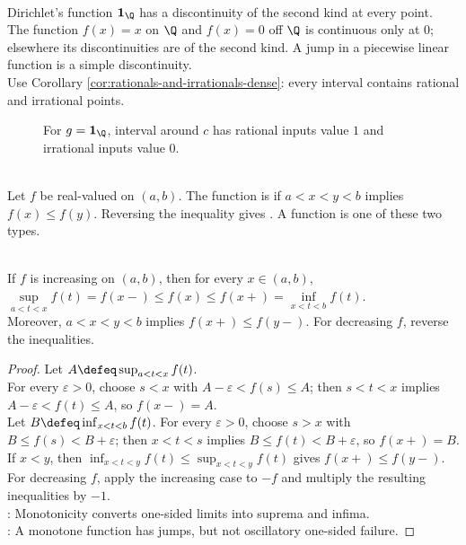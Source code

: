 \begin{example} \label{ex:basic-discontinuity-types} \\
Dirichlet's function $\mathbf{1}_{\Q}$ has a discontinuity of the second kind at every point.\\
The function $f(x)=x$ on $\Q$ and $f(x)=0$ off $\Q$ is continuous only at $0$; elsewhere its discontinuities are of the second kind. A jump in a piecewise linear function is a simple discontinuity.\\
Use Corollary \ref{cor:rationals-and-irrationals-dense}: every interval contains rational and irrational points.
\end{example}

\begin{figure}[H]
  \centering
  
  \caption{For $g=\mathbf{1}_{\Q}$, interval around $c$ has rational inputs value $1$ and irrational inputs value $0$.}
  \label{fig:dirichlet-dense-rows}
\end{figure}

\begin{definition} \label{def:monotone-real-function} \\
Let $f$ be real-valued on $(a,b)$. The function is  if $a<x<y<b$ implies $f(x)\leq f(y)$. Reversing the inequality gives . A  function is one of these two types.
\end{definition}

\begin{theorem} \label{thm:monotone-functions-one-sided-limits} \\
If $f$ is increasing on $(a,b)$, then for every $x\in(a,b)$, $\sup\limits_{a<t<x}f(t)=f(x-)\leq f(x)\leq f(x+)=\inf\limits_{x<t<b}f(t)$.\\
Moreover, $a<x<y<b$ implies $f(x+)\leq f(y-)$. For decreasing $f$, reverse the inequalities.
\begin{proof}
Let $A\defeq\sup_{a<t<x}f(t)$.\\
For every $\varepsilon>0$, choose $s<x$ with $A-\varepsilon<f(s)\leq A$; then $s<t<x$ implies $A-\varepsilon<f(t)\leq A$, so $f(x-)=A$.\\
Let $B\defeq\inf_{x<t<b}f(t)$. For every $\varepsilon>0$, choose $s>x$ with $B\leq f(s)<B+\varepsilon$; then $x<t<s$ implies $B\leq f(t)<B+\varepsilon$, so $f(x+)=B$. If $x<y$, then $\inf_{x<t<y}f(t)\leq\sup_{x<t<y}f(t)$ gives $f(x+)\leq f(y-)$.\\
For decreasing $f$, apply the increasing case to $-f$ and multiply the resulting inequalities by $-1$.\\
: Monotonicity converts one-sided limits into suprema and infima.\\
: A monotone function has jumps, but not oscillatory one-sided failure.
\end{proof}
\end{theorem}

